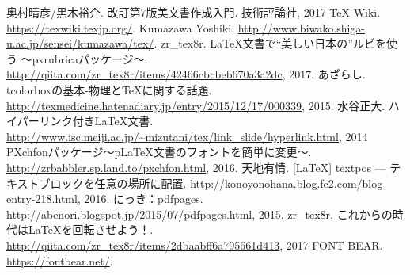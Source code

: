 
\begin{thebibliography}{99}
	奥村晴彦/黒木裕介.
	改訂第7版{\LaTeXe}美文書作成入門.
	技術評論社, 2017
	{\TeX} Wiki.
	\href{https://texwiki.texjp.org/}{https://texwiki.texjp.org/}.
	Kumazawa Yoshiki.
	\href{http://www.biwako.shiga-u.ac.jp/sensei/kumazawa/tex/}{http://www.biwako.shiga-u.ac.jp/sensei/kumazawa/tex/}.
	zr{\_}tex8r.
	LaTeX文書で“美しい日本の”ルビを使う ～pxrubricaパッケージ～.
	\href{http://qiita.com/zr_tex8r/items/42466cbcbeb670a3a2dc}{\url{http://qiita.com/zr_tex8r/items/42466cbcbeb670a3a2dc}}, 2017.
	あざらし.
	tcolorboxの基本-物理とTeXに関する話題.
	\href{http://texmedicine.hatenadiary.jp/entry/2015/12/17/000339}{http://texmedicine.hatenadiary.jp/entry/2015/12/17/000339}, 2015.
	水谷正大.
	ハイパーリンク付きLaTeX文書.
	\href{http://www.isc.meiji.ac.jp/~mizutani/tex/link_slide/hyperlink.html}{\url{http://www.isc.meiji.ac.jp/~mizutani/tex/link_slide/hyperlink.html}}, 2014
	PXchfonパッケージ～pLaTeX文書のフォントを簡単に変更～.
	\href{http://zrbabbler.sp.land.to/pxchfon.html}{http://zrbabbler.sp.land.to/pxchfon.html}, 2016.
	天地有情.
	[LaTeX] textpos --- テキストブロックを任意の場所に配置.
	\href{http://konoyonohana.blog.fc2.com/blog-entry-218.html}{http://konoyonohana.blog.fc2.com/blog-entry-218.html}, 2016.
	にっき：pdfpages.
	\href{http://abenori.blogspot.jp/2015/07/pdfpages.html}{http://abenori.blogspot.jp/2015/07/pdfpages.html}, 2015.
	zr{\_}tex8r.
	これからの時代はLaTeXを回転させよう！.
	\href{http://qiita.com/zr_tex8r/items/2dbaabff6a795661d413}{\url{http://qiita.com/zr_tex8r/items/2dbaabff6a795661d413}}, 2017
	FONT BEAR.
	\href{https://fontbear.net/}{https://fontbear.net/}.
\end{thebibliography}

